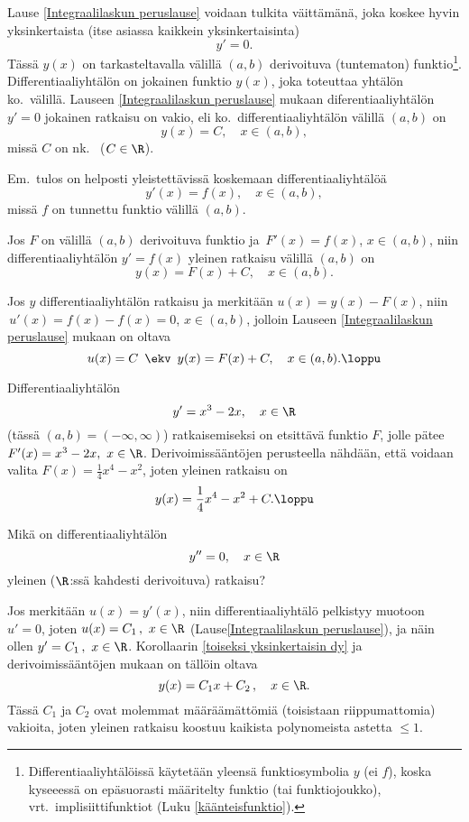 Lause \ref{Integraalilaskun peruslause} voidaan tulkita väittämänä, joka koskee hyvin
yksinkertaista (itse asiassa kaikkein yksinkertaisinta) 
\[
y'=0.
\]
Tässä $y(x)$ on tarkasteltavalla välillä $(a,b)$ derivoituva (tuntematon)
funktio\footnote[3]{Differentiaaliyhtälöissä käytetään yleensä funktiosymbolia $y$ (ei $f$),
koska kyseeessä on epäsuorasti määritelty funktio (tai funktiojoukko), vrt.\ 
implisiittifunktiot (Luku \ref{käänteisfunktio}).}. 
Differentiaaliyhtälön  on jokainen funktio $y(x)$, joka toteuttaa yhtälön ko.\
välillä. Lauseen \ref{Integraalilaskun peruslause} mukaan diferentiaaliyhtälön $y'=0$ jokainen
ratkaisu on vakio, eli ko.\ differentiaaliyhtälön \kor{yleinen ratkaisu} välillä $(a,b)$ on
\[
y(x)=C, \quad x\in(a,b),
\]
missä $C$ on nk.\  ($C\in\R$). 

Em.\ tulos on helposti yleistettävissä koskemaan differentiaaliyhtälöä
\[
y'(x)=f(x), \quad x\in(a,b),
\]
missä $f$ on tunnettu funktio välillä $(a,b)$.
\begin{Kor} \label{toiseksi yksinkertaisin dy} Jos $F$ on välillä $(a,b)$ derivoituva funktio
ja $\,F'(x)=f(x)$, $x\in(a,b)$, niin differentiaaliyhtälön $y'=f(x)$ yleinen ratkaisu välillä
$(a,b)$ on
\[
y(x)=F(x)+C, \quad x\in(a,b).
\]
\end{Kor}
\tod Jos $y$ differentiaaliyhtälön ratkaisu ja merkitään $u(x)=y(x)-F(x)$, niin
$\,u'(x)=f(x)-f(x)=0$, $x\in(a,b)$, jolloin Lauseen \ref{Integraalilaskun peruslause} mukaan
on oltava
\[
u(x)=C\,\ \ekv\,\ y(x)=F(x)+C, \quad x\in(a,b). \loppu
 \]
\begin{Exa} \label{V-6: dyex1} Differentiaaliyhtälön
\[
y'=x^3-2x, \quad x\in\R
\]
(tässä $(a,b)=(-\infty,\infty)$) ratkaisemiseksi on etsittävä funktio $F$, jolle pätee
$F'(x)=x^3-2x,\ x\in\R$. Derivoimissääntöjen perusteella nähdään, että voidaan valita
$F(x)=\frac{1}{4}x^4-x^2$, joten yleinen ratkaisu on
\[
y(x)=\frac{1}{4}x^4-x^2+C. \loppu
\]
\end{Exa}
\begin{Exa} Mikä on differentiaaliyhtälön
\[
y''=0, \quad x\in\R
\]
yleinen ($\R$:ssä kahdesti derivoituva) ratkaisu?
\end{Exa}
\ratk Jos merkitään $u(x)=y'(x)$, niin differentiaaliyhtälö pelkistyy muotoon $u'=0$, joten
$u(x)=C_1\,,\ x\in\R$ (Lause\ref{Integraalilaskun peruslause}), ja näin ollen
$y'=C_1\,,\ x\in\R$. Korollaarin \ref{toiseksi yksinkertaisin dy} ja derivoimissääntöjen mukaan
on tällöin oltava
\[
y(x)=C_1x+C_2\,, \quad x\in\R.
\]
Tässä $C_1$ ja $C_2$ ovat molemmat määräämättömiä (toisistaan riippumattomia) vakioita, joten
yleinen ratkaisu koostuu kaikista polynomeista astetta $\le 1$. \loppu

